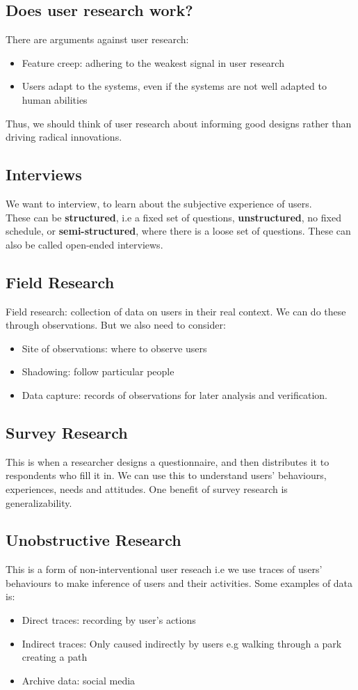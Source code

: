 \documentclass{article}
\begin{document}
\subsection{Does user research work?}
There are arguments against user research:
\begin{itemize}
    \item Feature creep: adhering to the weakest signal in user research
    \item Users adapt to the systems, even if the systems are not well adapted to human abilities
\end{itemize}
Thus, we should think of user research about informing good designs rather than driving radical innovations.
\subsection{Interviews}
We want to interview, to learn about the subjective experience of users. \\
These can be \textbf{structured}, i.e a fixed set of questions, \textbf{unstructured}, no fixed schedule, or \textbf{semi-structured}, where there is a loose set of questions. These can also be called open-ended interviews.
\subsection{Field Research}
Field research: collection of data on users in their real context. We can do these through observations. But we also need to consider:
\begin{itemize}
    \item Site of observations: where to observe users
    \item Shadowing: follow particular people
    \item Data capture: records of observations for later analysis and verification.
\end{itemize}
\subsection{Survey Research}
This is when a researcher designs a questionnaire, and then distributes it to respondents who fill it in. We can use this to understand users' behaviours, experiences, needs and attitudes. One benefit of survey research is generalizability. 
\subsection{Unobstructive Research}
This is a form of non-interventional user reseach i.e we use traces of users' behaviours to make inference of users and their activities. Some examples of data is:
\begin{itemize}
    \item Direct traces: recording by user's actions
    \item Indirect traces: Only caused indirectly by users e.g walking through a park creating a path
    \item Archive data: social media
\end{itemize}
\end{document}
